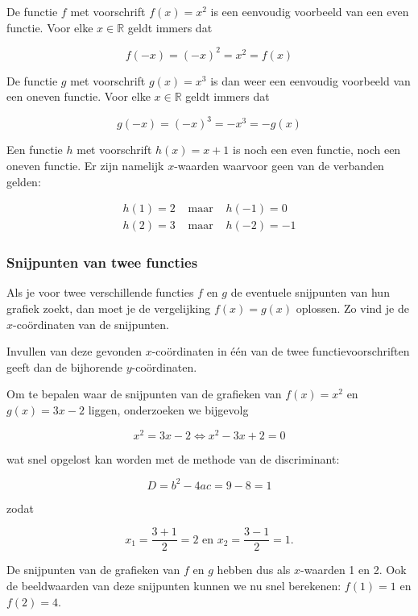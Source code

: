 \begin{voorbeeld}
	De functie $f$ met voorschrift $f(x)=x^2$ is een eenvoudig voorbeeld van een even functie. Voor elke  $x \in \mathbb{R}$ geldt immers dat 

\begin{equation*}
f(-x)=(-x)^2=x^2=f(x)
\end{equation*}

De functie $g$ met voorschrift $g(x)=x^3$ is dan weer een eenvoudig voorbeeld van een oneven functie. Voor elke $x \in \mathbb{R}$ geldt immers dat

\begin{equation*}
g(-x)=(-x)^3=-x^3=-g(x)
\end{equation*}

Een functie $h$ met voorschrift $h(x)=x+1$ is noch een even functie, noch een oneven functie. Er zijn namelijk $x$-waarden waarvoor geen van de verbanden gelden:

\begin{eqnarray*}
h(1) = 2 &\text{ maar }& h(-1) = 0 \\
h(2) = 3 &\text{ maar }& h(-2) = -1 
\end{eqnarray*}

\end{voorbeeld}

\subsubsection{Snijpunten van twee functies}

Als je voor twee verschillende functies $f$ en $g$ de
eventuele snijpunten van hun grafiek zoekt, dan moet je de vergelijking
$f(x)=g(x)$ oplossen. Zo vind je de $x$-co\"ordinaten van de snijpunten.


Invullen van deze gevonden $x$-co\"ordinaten in één van de twee functievoorschriften
geeft dan de bijhorende $y$-co\"ordinaten.




\begin{voorbeeld}
	Om te bepalen waar de snijpunten van de grafieken van $f(x)=x^2$ en $g(x)=3x-2$ liggen, onderzoeken we bijgevolg

\begin{equation*}
x^2 = 3x-2 \iff x^2-3x+2=0
\end{equation*}

wat snel opgelost kan worden met de methode van de discriminant:

\begin{equation*}
D = b^2 - 4ac = 9-8=1
\end{equation*}

zodat

\begin{equation*}
x_1 = \frac{3+1}{2} = 2 \text{ en } x_2 = \frac{3-1}{2} = 1.
\end{equation*}


De snijpunten van de grafieken van $f$ en $g$ hebben dus als $x$-waarden 1 en 2. Ook de beeldwaarden van deze snijpunten kunnen we nu snel berekenen: $f(1)=1$ en $f(2)=4$.

\end{voorbeeld}

